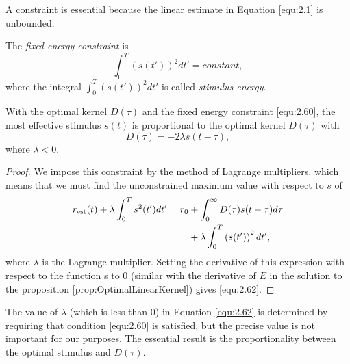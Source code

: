 \begin{rem}
  A constraint is essential because the linear estimate in Equation \ref{equ:2.1} is unbounded.
\end{rem}

\begin{defn}
  \label{def:stimulusEnergy}
  The \emph{fixed energy constraint} is
  \begin{equation}
    \label{equ:2.60}
    \int_0^T\left(s(t')\right)^2dt' = constant,
  \end{equation}
  where the integral $\int_0^T\left(s(t')\right)^2dt'$ is called \emph{stimulus energy}.
\end{defn}

\begin{prop}
  \label{prop:mostEffectiveStimulus}
  With the optimal kernel $D(\tau)$ and the fixed energy constraint \ref{equ:2.60}, the most effective stimulus $s(t)$ is proportional to the optimal kernel $D(\tau)$ with
  \begin{equation}
    \label{equ:2.62}
    D(\tau) = -2\lambda s(t-\tau),
  \end{equation}
  where $\lambda < 0$. 
\end{prop}
\begin{proof}
  We impose this constraint by the method of Lagrange multipliers, which means that we must find the unconstrained maximum value with respect to $s$ of
  \begin{equation}
    \label{equ:2.61}
    \begin{aligned}
      r_{\rm{est}}(t)+\lambda\int_0^Ts^2(t')dt' = r_0&+\int_0^{\infty}D(\tau)s(t-\tau)d\tau \\
      &+ \lambda\int_0^T\left(s(t')\right)^2dt',
    \end{aligned}
  \end{equation}
  where $\lambda$ is the Lagrange multiplier. Setting the derivative of this expression with respect to the function s to 0 (similar with the derivative of $E$ in the solution to the proposition \ref{prop:OptimalLinearKernel}) gives \ref{equ:2.62}.
\end{proof}

\begin{rem}
  The value of $\lambda$ (which is less than $0$) in Equation \ref{equ:2.62} is determined by requiring that condition \ref{equ:2.60} is satisfied, but the precise value is not important for our purposes. The essential result is the proportionality between the optimal stimulus and $D(\tau)$.
\end{rem}

